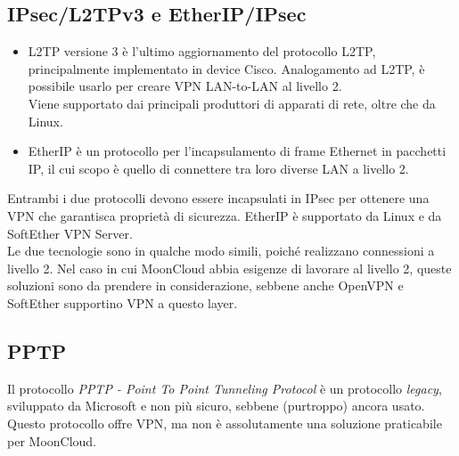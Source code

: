 	      
	      
\subsection{IPsec/L2TPv3 e EtherIP/IPsec}
\begin{itemize}
	\item L2TP versione 3 è l'ultimo aggiornamento del protocollo L2TP, principalmente implementato in
	      device Cisco. Analogamento ad L2TP, è possibile usarlo per creare VPN LAN-to-LAN al livello 2.\\
	      Viene supportato dai principali produttori di apparati di rete, oltre che da Linux.
	\item EtherIP è un protocollo per l'incapsulamento di frame Ethernet in pacchetti IP, il cui scopo è quello
	      di connettere tra loro diverse LAN a livello 2.
\end{itemize}
Entrambi i due protocolli devono essere incapsulati in IPsec per ottenere una VPN che garantisca proprietà
di sicurezza.
EtherIP è
supportato da Linux e da SoftEther VPN Server.\\
Le due tecnologie sono in qualche modo simili, poiché realizzano connessioni a livello 2. Nel caso in cui
MoonCloud abbia esigenze di lavorare al livello 2, queste soluzioni sono da prendere in considerazione, sebbene
anche OpenVPN e SoftEther supportino VPN a questo layer.
	      
	      
\subsection{PPTP}
Il protocollo \textit{PPTP - Point To Point Tunneling Protocol} è un protocollo
\textit{legacy}, sviluppato da Microsoft e non più sicuro, sebbene (purtroppo)
ancora usato.
Questo protocollo offre VPN, ma non è assolutamente una soluzione praticabile per
MoonCloud.
